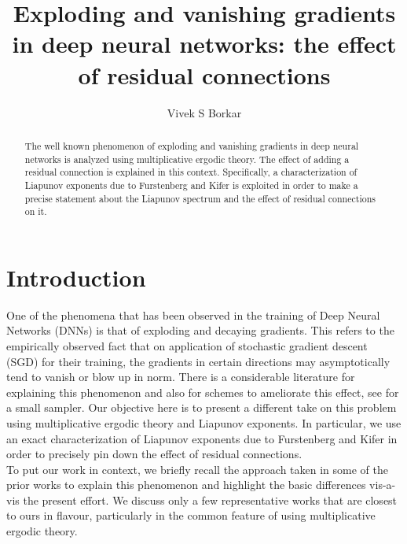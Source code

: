 \documentclass[12pt]{amsart}
\title[Exploding and vanishing gradients]{Exploding and vanishing gradients in  deep neural networks: the effect of residual connections}
\author{Vivek S Borkar}
\theoremstyle{plain}
\theoremstyle{definition}
\theoremstyle{remark}
\newcommand{\0}{\textbf{0}}
\begin{document}
\maketitle

\begin{abstract}
The well known phenomenon of exploding and vanishing gradients in deep neural networks is analyzed using multiplicative ergodic theory. The effect of adding a residual connection is explained in this context. Specifically, a characterization of Liapunov exponents due to Furstenberg and Kifer \cite{FK} is exploited in order to make a precise statement about the Liapunov spectrum and the effect of residual connections on it.
\end{abstract}




\section{Introduction}

One of the phenomena that has been observed in the training of Deep Neural Networks (DNNs) is that of exploding and decaying gradients. This refers to the empirically observed fact that on application of stochastic gradient descent (SGD) for their training, the gradients in certain directions may asymptotically tend to vanish or blow up in norm. There is a considerable literature for explaining this phenomenon and also for schemes to ameliorate this effect, see \cite{Allen-Zhu, Avelin, Chen, Engleken, Hanin1, Hanin2, Storm} for a small sampler. Our objective here is to present a different take on this problem using multiplicative ergodic theory and Liapunov exponents. In particular, we use an exact characterization of Liapunov exponents due to Furstenberg and Kifer \cite{FK} in order to precisely pin down the effect of residual connections. \\

To put our work in context, we briefly recall the approach taken in some of the prior works to explain this phenomenon and highlight the basic differences vis-a-vis the present effort. We discuss only a few representative works that are closest to ours in flavour, particularly in the common feature  of using multiplicative ergodic theory. \\
\end{document}
